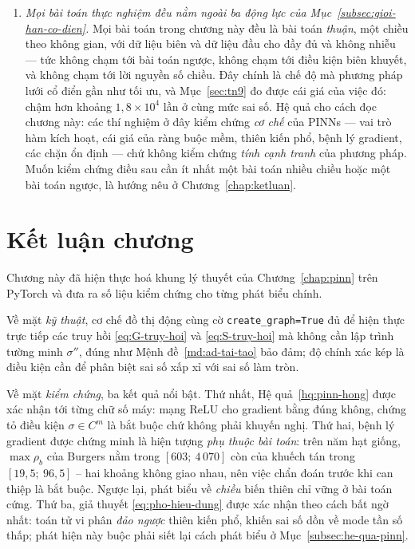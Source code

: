 \begin{enumerate}[label=(\arabic*),leftmargin=2.2em,itemsep=4pt]
\item \emph{Mọi bài toán thực nghiệm đều nằm ngoài ba động lực của
Mục~\ref{subsec:gioi-han-co-dien}.} Mọi bài toán trong chương này đều là bài
toán \emph{thuận}, một chiều theo không gian, với dữ liệu biên và dữ liệu đầu
cho đầy đủ và không nhiễu --- tức không chạm tới bài toán ngược, không chạm tới
điều kiện biên khuyết, và không chạm tới lời nguyền số chiều. Đây chính là chế
độ mà phương pháp lưới cổ điển gần như tối ưu, và Mục~\ref{sec:tn9} đo được cái
giá của việc đó: chậm hơn khoảng $1{,}8\times10^{4}$ lần ở cùng mức sai số. Hệ quả cho cách đọc
chương này: các thí nghiệm ở đây kiểm chứng \emph{cơ chế} của PINNs --- vai trò
hàm kích hoạt, cái giá của ràng buộc mềm, thiên kiến phổ, bệnh lý gradient, các
chặn ổn định --- chứ không kiểm chứng \emph{tính cạnh tranh} của phương pháp.
Muốn kiểm chứng điều sau cần ít nhất một bài toán nhiều chiều hoặc một bài toán
ngược, là hướng nêu ở Chương~\ref{chap:ketluan}.
\end{enumerate}
 
\section*{Kết luận chương}
 
Chương này đã hiện thực hoá khung lý thuyết của Chương~\ref{chap:pinn} trên
PyTorch và đưa ra số liệu kiểm chứng cho từng phát biểu chính.
 
Về mặt \emph{kỹ thuật}, cơ chế đồ thị động cùng cờ \texttt{create\_graph=True} đủ
để hiện thực trực tiếp các truy hồi \eqref{eq:G-truy-hoi} và
\eqref{eq:S-truy-hoi} mà không cần lập trình tường minh $\sigma''$, đúng như
Mệnh đề~\ref{md:ad-tai-tao} bảo đảm; độ chính xác kép là điều kiện cần để phân
biệt sai số xấp xỉ với sai số làm tròn.
 
Về mặt \emph{kiểm chứng}, ba kết quả nổi bật. Thứ nhất,
Hệ quả~\ref{hq:pinn-hong} được xác nhận tới từng chữ số máy: mạng ReLU cho
gradient bằng đúng không, chứng tỏ điều kiện $\sigma \in C^m$ là bắt buộc chứ
không phải khuyến nghị. Thứ hai, bệnh lý gradient được chứng minh là hiện tượng
\emph{phụ thuộc bài toán}: trên năm hạt giống, $\max\rho_b$ của Burgers nằm trong
$[603;\ 4\,070]$ còn của khuếch tán trong $[19{,}5;\ 96{,}5]$ -- hai khoảng
không giao nhau, nên việc chẩn đoán trước khi can thiệp là bắt buộc. Ngược lại,
phát biểu về \emph{chiều} biến thiên chỉ vững ở bài toán cứng. Thứ ba, giả thuyết \eqref{eq:pho-hieu-dung} được xác nhận theo
cách bất ngờ nhất: toán tử vi phân \emph{đảo ngược} thiên kiến phổ, khiến sai số
dồn về mode tần số thấp; phát hiện này buộc phải siết lại cách phát biểu ở
Mục~\ref{subsec:he-qua-pinn}.
 
